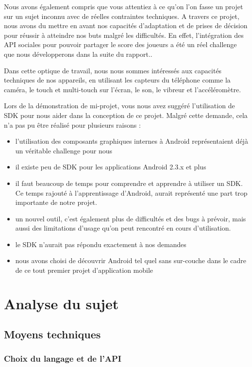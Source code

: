 \documentclass{report}
\begin{document}
Nous avons également compris que vous attentiez à ce qu’on l’on fasse un projet sur un sujet inconnu avec de réelles contraintes techniques. A travers ce projet, nous avons du mettre en avant nos capacités d’adaptation et de prises de décision pour réussir à atteindre nos buts malgré les difficultés. En effet, l’intégration des API sociales pour pouvoir partager le score des joueurs a été un réel challenge que nous développerons dans la suite du rapport..

Dans cette optique de travail, nous nous sommes intéressés aux capacités techniques de nos appareils, en utilisant les capteurs du téléphone comme la caméra, le touch et multi-touch sur l’écran, le son, le vibreur et l’accéléromètre.

Lors de la démonstration de mi-projet, vous nous avez suggéré l’utilisation de SDK pour nous aider dans la conception de ce projet. 
Malgré cette demande, cela n’a pas pu être réalisé pour plusieurs raisons :
\begin{itemize}
\item l’utilisation des composants graphiques internes à Android représentaient déjà un véritable challenge pour nous
\item il existe peu de SDK pour les applications Android 2.3.x et plus
\item il faut beaucoup de temps pour comprendre et apprendre à utiliser un SDK. Ce temps rajouté à l’apprentissage d’Android, aurait représenté une part trop importante de notre projet.
\item un nouvel outil, c’est également plus de difficultés et des bugs à prévoir, mais aussi des limitations d’usage qu’on peut rencontré en cours d’utilisation.
\item le SDK n’aurait pas répondu exactement à nos demandes
\item nous avons choisi de découvrir Android tel quel sans sur-couche dans le cadre de ce tout premier projet d’application mobile
\end{itemize}

\section{Analyse du sujet}

\subsection{Moyens techniques}

\subsubsection{Choix du langage et de l'API}
\end{document}
